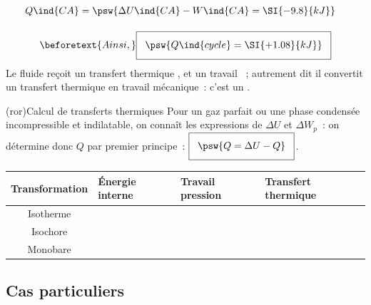 \documentclass[../../main/main.tex]{subfiles}
\begin{document}
\begin{tcb}
\begin{enumerate}[start=4, label=\sqenumi]
\begin{isd}[sidebyside align=top]
\begin{itemize}
\begin{align*}
					            Q\ind{CA} & = \psw{\Delta{U}\ind{CA} - W\ind{CA} = \SI{-9.8}{kJ}}
					            \vphantom{\frac{5}{2}}
				            \end{align*}
			      \end{itemize}
		      \end{isd}
		      \begin{gather*}
			      \beforetext{Ainsi,}
			      \setlength{\fboxsep}{3mm}
			      \boxed{\psw{Q\ind{cycle} = \SI{+1.08}{kJ}}}
		      \end{gather*}
		      Le fluide reçoit un transfert thermique , et
		      un travail ~; autrement dit il convertit un
		      transfert thermique en travail mécanique~: c'est un
		      .
	\end{enumerate}
\end{tcb}

\begin{tcb*}(ror){Calcul de transferts thermiques}
	Pour un gaz parfait ou une phase condensée incompressible et indilatable, on
	connaît les expressions de $\Delta{U}$ et $\Delta{W_p}$~: on détermine donc
	$Q$ par premier principe~: $\setlength{\fboxsep}{3mm}\boxed{\psw{Q =
				\Delta{U}-Q}}$.
	\vspace{-15pt}
	\begin{center}
		\begin{tabularx}{\linewidth}{cYYY}
			\toprule
			\textbf{Transformation}
			 &
			\textbf{Énergie interne}
			 &
			\textbf{Travail pression}
			 &
			\textbf{Transfert thermique}
			\\
			\midrule
			Isotherme
			 &
			 &
			 &
			\\\addlinespace[0.5em]
			Isochore
			 &
			 &
			 &
			\\\addlinespace[1em]
			Monobare
			 &
			 &
			 &
			\\
			\bottomrule
		\end{tabularx}
	\end{center}
\end{tcb*}

\subsection{Cas particuliers}
\end{document}
